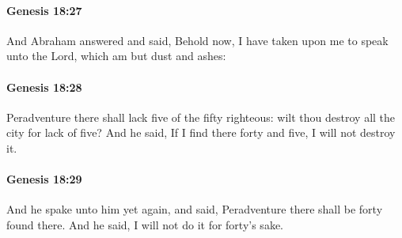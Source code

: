 		\paragraph{Genesis 18:27} %
			\label{GENESIS-18-27}

			And Abraham answered and said, Behold now, I have taken upon me to speak unto the Lord, which am but dust and ashes:


		\paragraph{Genesis 18:28} %
			\label{GENESIS-18-28}

			Peradventure there shall lack five of the fifty righteous: wilt thou destroy all the city for lack of five?  And he said, If I find there forty and five, I will not destroy it.


		\paragraph{Genesis 18:29} %
			\label{GENESIS-18-29}

			And he spake unto him yet again, and said, Peradventure there shall be forty found there.  And he said, I will not do it for forty's sake.


